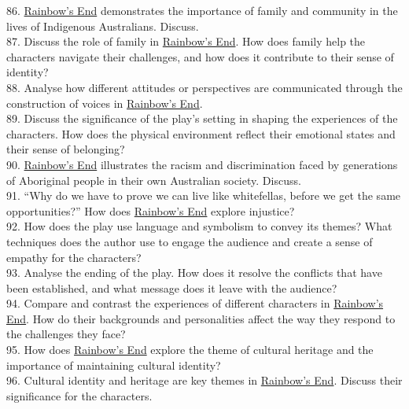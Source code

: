 \documentclass[a4paper]{article}
\begin{document}
86. \underline{Rainbow’s End} demonstrates the importance of family and community in the lives of Indigenous Australians. Discuss.\\

87. Discuss the role of family in \underline{Rainbow’s End}. How does family help the characters navigate their challenges, and how does it contribute to their sense of identity?\\

88. Analyse how different attitudes or perspectives are communicated through the construction of voices in \underline{Rainbow’s End}.\\

89. Discuss the significance of the play’s setting in shaping the experiences of the characters. How does the physical environment reflect their emotional states and their sense of belonging?\\

90. \underline{Rainbow’s End} illustrates the racism and discrimination faced by generations of Aboriginal people in their own Australian society. Discuss.\\

91. “Why do we have to prove we can live like whitefellas, before we get the same opportunities?” How does \underline{Rainbow’s End} explore injustice?\\

92. How does the play use language and symbolism to convey its themes? What techniques does the author use to engage the audience and create a sense of empathy for the characters?\\

93. Analyse the ending of the play. How does it resolve the conflicts that have been established, and what message does it leave with the audience?\\

94. Compare and contrast the experiences of different characters in \underline{Rainbow’s End}. How do their backgrounds and personalities affect the way they respond to the challenges they face?\\

95. How does \underline{Rainbow’s End} explore the theme of cultural heritage and the importance of maintaining cultural identity?\\

96. Cultural identity and heritage are key themes in \underline{Rainbow’s End}. Discuss their significance for the characters.\\
\end{document}
